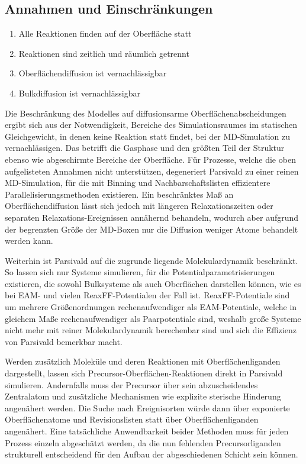 \subsection{Annahmen und Einschränkungen}

\begin{enumerate}
\item Alle Reaktionen finden auf der Oberfläche statt
\item Reaktionen sind zeitlich und räumlich getrennt
\item Oberflächendiffusion ist vernachlässigbar
\item Bulkdiffusion ist vernachlässigbar
\end{enumerate}

Die Beschränkung des Modelles auf diffusionsarme Oberflächenabscheidungen ergibt sich aus der Notwendigkeit, Bereiche des Simulationsraumes im statischen Gleichgewicht, in denen keine Reaktion statt findet, bei der MD-Simulation zu vernachlässigen.
Das betrifft die Gasphase und den größten Teil der Struktur ebenso wie abgeschirmte Bereiche der Oberfläche.
Für Prozesse, welche die oben aufgelisteten Annahmen nicht unterstützen, degeneriert Parsivald zu einer reinen MD-Simulation, für die mit Binning und Nachbarschaftslisten effizientere Parallelisierungsmethoden existieren.
Ein beschränktes Maß an Oberflächendiffusion lässt sich jedoch mit längeren Relaxationszeiten oder separaten Relaxations-Ereignissen annähernd behandeln, wodurch aber aufgrund der begrenzten Größe der MD-Boxen nur die Diffusion weniger Atome behandelt werden kann.

Weiterhin ist Parsivald auf die zugrunde liegende Molekulardynamik beschränkt.
So lassen sich nur Systeme simulieren, für die Potentialparametrisierungen existieren, die sowohl Bulksysteme als auch Oberflächen darstellen können, wie es bei EAM- und vielen ReaxFF-Potentialen der Fall ist.
ReaxFF-Potentiale sind um mehrere Größenordnungen rechenaufwendiger als EAM-Potentiale, welche in gleichem Maße rechenaufwendiger als Paarpotentiale sind, weshalb große Systeme nicht mehr mit reiner Molekulardynamik berechenbar sind und sich die Effizienz von Parsivald bemerkbar macht.

Werden zusätzlich Moleküle und deren Reaktionen mit Oberflächenliganden dargestellt, lassen sich Precursor-Oberflächen-Reaktionen direkt in Parsivald simulieren.
Andernfalls muss der Precursor über sein abzuscheidendes Zentralatom und zusätzliche Mechanismen wie explizite sterische Hinderung angenähert werden.
Die Suche nach Ereignisorten würde dann über exponierte Oberflächenatome und Revisionslisten statt über Oberflächenliganden angenähert.
Eine tatsächliche Anwendbarkeit beider Methoden muss für jeden Prozess einzeln abgeschätzt werden, da die nun fehlenden Precursorliganden strukturell entscheidend für den Aufbau der abgeschiedenen Schicht sein können.

